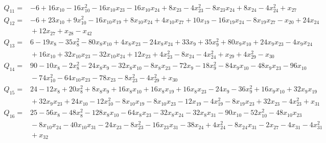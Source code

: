 \documentclass[11pt]{article}
\theoremstyle{definition}\newtheorem{definition}[theorem]{Definition}
\begin{document}
{\begin{align*}
\end{align*}
\begin{align*}
 Q_{11}={}&-6 +16x_{10} -16x_{10}^{2} -16x_{10}x_{23} -16x_{10}x_{24} +8x_{23} -4x_{23}^{2} -8x_{23}x_{24} +8x_{24} -4x_{24}^{2} +x_{27}
\end{align*}
\begin{align*}
 Q_{12}={}&-6 +23x_{10} +9x_{10}^{2} -16x_{10}x_{19} +8x_{10}x_{24} +4x_{10}x_{27} +10x_{19} -16x_{19}x_{24} -8x_{19}x_{27} -x_{20} +24x_{24}\\
 &{}+12x_{27} +x_{28} -x_{42}
\end{align*}
\begin{align*}
 Q_{13}={}&6 -19x_{8} -35x_{8}^{2} -80x_{8}x_{10} +4x_{8}x_{23} -24x_{8}x_{24} +33x_{9} +35x_{9}^{2} +80x_{9}x_{10} +24x_{9}x_{23} -4x_{9}x_{24}\\
 &{}+16x_{10} +32x_{10}x_{23} -32x_{10}x_{24} +12x_{23} +4x_{23}^{2} -8x_{24} -4x_{24}^{2} +x_{29} +4x_{29}^{2} -x_{30}
\end{align*}
\begin{align*}
 Q_{14}={}&90 -10x_{8} -2x_{8}^{2} -24x_{8}x_{9} -32x_{8}x_{10} -8x_{8}x_{23} -72x_{9} -18x_{9}^{2} -84x_{9}x_{10} -48x_{9}x_{23} -96x_{10}\\
 &{}-74x_{10}^{2} -64x_{10}x_{23} -78x_{23} -8x_{23}^{2} -4x_{29}^{2} +x_{30}
\end{align*}
\begin{align*}
 Q_{15}={}&24 -12x_{8} +20x_{8}^{2} +8x_{8}x_{9} +16x_{8}x_{10} +16x_{8}x_{19} +16x_{8}x_{23} -24x_{9} -36x_{9}^{2} +16x_{9}x_{10} +32x_{9}x_{19}\\
 &{}+32x_{9}x_{23} +24x_{10} -12x_{10}^{2} -8x_{10}x_{19} -8x_{10}x_{23} -12x_{19} -4x_{19}^{2} -8x_{19}x_{23} +32x_{23} -4x_{23}^{2} +x_{31}
\end{align*}
\begin{align*}
 Q_{16}={}&25 -56x_{8} -48x_{8}^{2} -128x_{8}x_{10} -64x_{8}x_{23} -32x_{8}x_{24} -32x_{8}x_{31} -90x_{10} -52x_{10}^{2} -48x_{10}x_{23}\\
 &{}-8x_{10}x_{24} -40x_{10}x_{31} -24x_{23} -8x_{23}^{2} -16x_{23}x_{31} -38x_{24} +4x_{24}^{2} -8x_{24}x_{31} -2x_{27} -4x_{31} -4x_{31}^{2}\\
 &{}+x_{32}
\end{align*}
\begin{align*}

\end{align*}}
\end{document}
